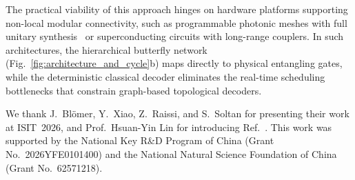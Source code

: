 \documentclass[aps,prl,twocolumn,superscriptaddress]{revtex4-2}
\begin{document}
The practical viability of this approach hinges on hardware platforms supporting non-local modular connectivity, such as programmable photonic meshes with full unitary synthesis~\cite{yamasaki2020} or superconducting circuits with long-range couplers. In such architectures, the hierarchical butterfly network (Fig.~\ref{fig:architecture_and_cycle}b) maps directly to physical entangling gates, while the deterministic classical decoder eliminates the real-time scheduling bottlenecks that constrain graph-based topological decoders.


\begin{acknowledgments}
We thank J.~Bl\"omer, Y.~Xiao, Z.~Raissi, and S.~Soltan for presenting their work at ISIT~2026, and Prof.\ Hsuan-Yin Lin for introducing Ref.~\cite{conrad2024}. This work was supported by the National Key R\&D Program of China (Grant No.~2026YFE0101400) and the National Natural Science Foundation of China (Grant No.~62571218).
\end{acknowledgments}

\end{document}
